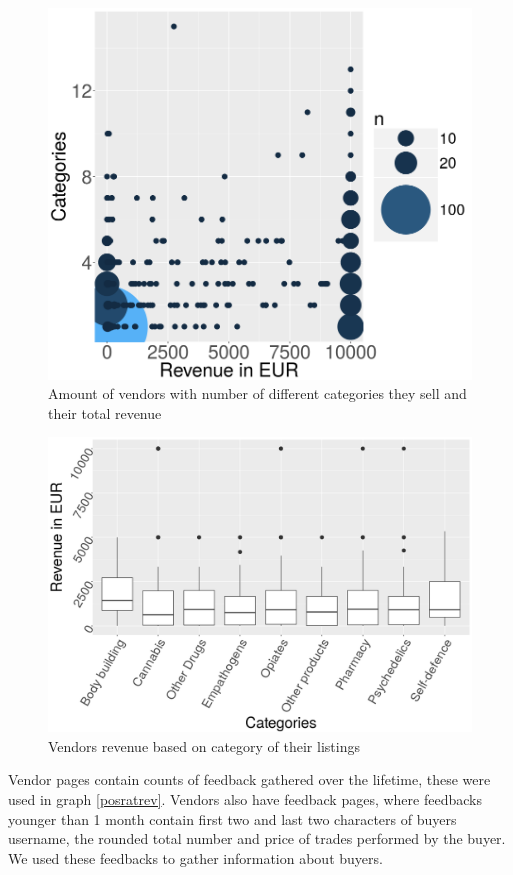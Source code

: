 \documentclass[
  digital, %
  table,   %
  lof,     %
  lot,     %
  oneside
]{fithesis3}
\begin{document}
\begin{figure}[!htb]
    \centering
    \includegraphics[scale=0.4]{catxrev}
    \caption{Amount of vendors with number of different categories they sell and their total revenue}
    \label{catxrev}
\end{figure}

\begin{figure}[!htb]
    \centering
    \includegraphics[scale=0.4]{boxcat}
    \caption{Vendors revenue based on category of their listings}
    \label{boxcat}
\end{figure}


Vendor pages contain counts of feedback gathered over the lifetime, these were used
in graph \ref{posratrev}. Vendors also have feedback pages, where feedbacks younger than
1 month contain first two and last two characters of buyers username,
the rounded total number and price of trades performed by the buyer.
We used these feedbacks to gather information about buyers.
\end{document}
